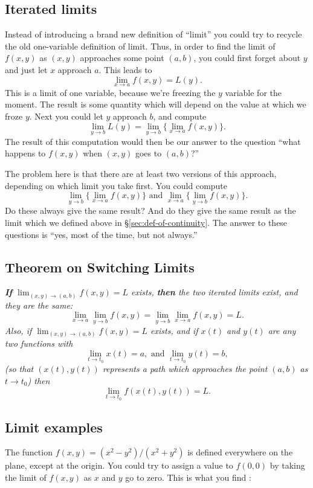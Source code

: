 \subsection{Iterated limits} Instead of introducing a brand new    %
definition of ``limit'' you could try to recycle the old one-variable
definition of limit.  Thus, in order to find the limit of $f(x, y)$ as
$(x,y)$ approaches some point $(a,b)$, you could first forget about
$y$ and just let $x$ approach $a$.  This leads to
\[
\lim_{x\to a}f(x, y)  = L(y).
\]
This is a limit of one variable, because we're freezing the $y$
variable for the moment.  The result is some quantity which will
depend on the value at which we froze $y$.  Next you could let
$y$ approach $b$, and compute
\[
\lim_{y\to b} L(y) = \lim_{y\to b}\bigl\{\lim_{x\to a}f(x, y)\bigr\}.
\]
The result of this computation would then be our answer to the question
``what happens to $f(x, y)$ when $(x, y)$ goes to $(a, b)$?''

The problem here is that there are at least two versions of this
approach, depending on which limit you take first. You could compute
\[
\lim_{y\to b}\bigl\{\lim_{x\to a}f(x, y)\bigr\}
\text{ and }
\lim_{x\to a}\bigl\{\lim_{y\to b}f(x, y)\bigr\}.
\]
Do these always give the same result?  And do they give the same
result as the limit which we defined above in
\S\ref{sec:def-of-continuity}.  The answer to these questions is
``yes, most of the time, but not always.''

\subsection{Theorem on Switching Limits}\label{sec:01switching-limits}   %
\itshape \textbf{If} $\lim_{(x,y)\to (a, b)} f(x, y) = L$ exists,
\textbf{then} the two iterated limits exist, and they are the same:
\[
\lim_{x\to a}\lim_{y\to b} f(x,y) = \lim_{y\to b}\lim_{x\to a} f(x,y)
= L.
\]
Also, if $\lim_{(x,y)\to (a, b)} f(x, y) = L$ exists, and if $x(t)$
and $y(t)$ are any two functions with
\[
\lim_{t\to t_0} x(t) = a, \text{ and }
\lim_{t\to t_0} y(t) = b,
\]
(so that $(x(t),y(t))$ represents a path which approaches the point
$(a,b)$ as $t\to t_0$) then
\[
\lim_{t\to t_0}f(x(t), y(t)) = L.
\]

\upshape

\subsection{Limit examples}    %
\label{sec:limit-examples}
The function $f(x, y) = (x^2-y^2) / (x^2+y^2)$ is defined everywhere
on the plane, except at the origin.  You could try to assign a value
to $f(0,0)$ by taking the limit of $f(x,y)$ as $x$ and $y$ go to zero.
This is what you find :

